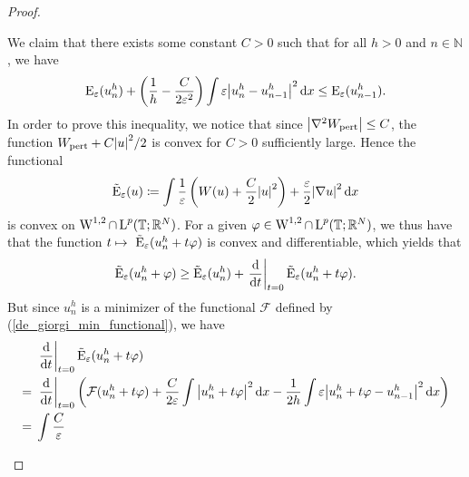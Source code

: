 \begin{proof}
\begin{description}[wide=0pt]
		We claim that there exists some constant $ C > 0 $ such that for all $ h > 0 $ and $ n \in \mathbb{ N } $, we have
		\begin{equation}
			\label{discrete_optimal_energy_dissipation}
			\operatorname{E}_{ \varepsilon } ( u_{ n }^{ h } )
			+
			\left( \frac{ 1 }{ h } - \frac{ C }{ 2 \varepsilon^{ 2 } } \right)
			\int \varepsilon \abs{ u_{ n }^{ h } - u_{ n - 1 }^{ h } }^{ 2 } \dd{ x }
			\leq
			\operatorname{E}_{ \varepsilon } ( u_{ n - 1 }^{ h } ).
		\end{equation}
		In order to prove this inequality, we notice that since $ \abs{ 
		\nabla^{ 2 } W_{ \mathrm{pert} } } \leq C $, the function $ W_{ 
		\mathrm{pert} } + C \abs{ u }^{ 2 }/2 $ is convex for $ C > 0 $ 
		sufficiently large.
		Hence the functional 
		\begin{equation*}
			\tilde{\operatorname{E}}_{ \varepsilon }  ( u )
			\coloneqq
			\int 
			\frac{ 1 }{ \varepsilon }
			\left( W ( u ) + \frac{ C }{ 2 } \abs{ u }^{ 2 } \right)
			+
			\frac{ \varepsilon}{ 2 }
			\abs{ \nabla u }^{ 2 }
			\dd{ x }
		\end{equation*}
		is convex on $ \operatorname{W}^{ 1 , 2 } \cap \operatorname{L}^{ p } ( \operatorname{\mathbb{T}} ; \mathbb{ R 
		}^{ N } ) $. For a given $ \varphi \in \operatorname{W}^{ 1 , 2 } \cap \operatorname{L}^{ p } ( 
		\operatorname{\mathbb{T}} ; \mathbb{ R }^{ N } ) $, we thus have that the function
		$ t \mapsto \ \tilde{\operatorname{E}}_{ \varepsilon } ( u_{ n }^{ h } + t 
		\varphi ) $ is convex and differentiable, which yields that
		\begin{equation}
			\label{convexity_at_time_1}
			\tilde{\operatorname{E}}_{ \varepsilon } ( u_{ n }^{ h } + \varphi )
			\geq
			\tilde{\operatorname{E}}_{ \varepsilon } ( u_{ n }^{ h } ) + 
			\left.\dv{ t }\right|_{ t = 0 } \tilde{\operatorname{E}}_{ \varepsilon } ( 
			u_{ n }^{ h } + t \varphi ).
		\end{equation} 
		But since $ u_{ n }^{ h } $ is a minimizer of the functional $\mathcal{ 
		F }$ defined by (\ref{de_giorgi_min_functional}), we have
		\begin{align*}
			&\left. \dv{ t } \right|_{ t= 0 }
			\tilde{\energy}_{ \varepsilon} ( u_{ n }^{ h } + t \varphi )
			\\
			={}&
			\left. \dv{ t } \right|_{ t = 0 } 
			\left(
			\mathcal{ F } ( u_{ n }^{ h } + t \varphi )
			+ 
			\frac{ C }{ 2 \varepsilon } 
			\int 
			\abs{ u_{ n }^{ h } + t \varphi }^{ 2 } 
			\dd{ x }
			-
			\frac{ 1 }{ 2h } 
			\int 
			\varepsilon
			\abs{ u_{n }^{ h } + t \varphi - u_{ n - 1 }^{ h } }^{ 2 } 
			\dd{ x }
			\right)
			\\
			={}& 
			\int
			\frac{ C }{ \varepsilon }

\end{align*}
\end{description}
\end{proof}
